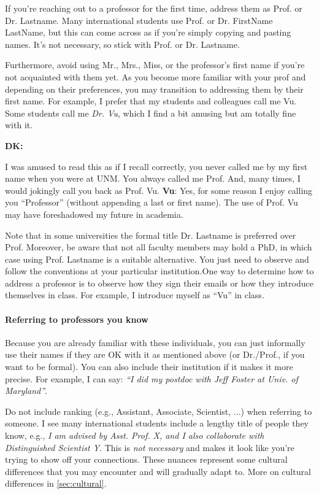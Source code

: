 \documentclass[oneside,11pt,dvipsnames]{book}
\newenvironment{commentbox}[1][]{
  \small
  \begin{mybox}
    {\small \textbf{#1}}
  }{
  \end{mybox}
}
\begin{document}
If you're reaching out to a professor for the first time,  address them as Prof. or Dr. Lastname. Many international students use Prof. or Dr. FirstName LastName, but this can come across as if you're simply copying and pasting names. It's not necessary, so stick with Prof. or Dr. Lastname.


Furthermore, avoid using Mr., Mrs., Miss, or the professor's first name if you're not acquainted with them yet.  As you become more familiar with your prof and depending on their preferences, you may transition to addressing them by their first name.
For example, I prefer that my students and colleagues call me Vu. Some students call me \emph{Dr. Vu}, which I find a bit amusing but am totally fine with it.

\begin{commentbox}[DK:]
  I was amused to read this as if I recall correctly, you never called me by my first name when you were at UNM. You always called me Prof. And, many times, I would jokingly call you back as Prof. Vu.
  \tcblower
  \textbf{Vu}: Yes, for some reason I enjoy calling you ``Professor'' (without appending a last or first name).  The use of Prof. Vu may have foreshadowed my future in academia.
\end{commentbox}

Note that in some universities the formal title Dr. Lastname is preferred over Prof. Moreover, be aware that not all faculty members may hold a PhD, in which case using Prof. Lastname is a suitable alternative. 	You just need to observe and follow the conventions at your particular institution.One way to determine how to address a professor is to observe how they sign their emails or how they introduce themselves in class. For example, I introduce myself as ``Vu'' in class.



\paragraph{Referring to professors you know} Because you are already familiar with these individuals, you can just informally use their names if they are OK with it as mentioned above (or Dr./Prof., if you want to be formal). You can also include their institution if it makes it more precise.  For example, I can say:  \emph{``I did my postdoc with Jeff Foster at Univ. of Maryland''}.

Do not include ranking (e.g., Assistant, Associate, Scientist, ...) when referring to someone. I see many international students include a lengthy title of people they know, e.g., \emph{I am advised by Asst. Prof. X, and I also collaborate with Distinguished Scientist Y}.  This is \emph{not necessary} and makes it look like you're trying to show off your connections. These nuances represent some cultural differences that you may encounter and will gradually adapt to. More on cultural differences in \autoref{sec:cultural}.
\end{document}
